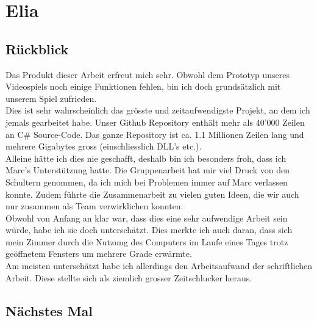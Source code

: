 \chapter{Elia}

\section{Rückblick}
Das Produkt dieser Arbeit erfreut mich sehr. Obwohl dem Prototyp unseres Videospiels noch einige Funktionen fehlen, bin ich doch grundsätzlich mit unserem Spiel zufrieden. \\
Dies ist sehr wahrscheinlich das grösste und zeitaufwendigste Projekt, an dem ich jemals gearbeitet habe. Unser Github Repository enthält mehr als 40'000 Zeilen an C\# Source-Code.
Das ganze Repository ist ca. 1.1 Millionen Zeilen lang und mehrere Gigabytes gross (einschliesslich DLL's etc.). \\
Alleine hätte ich dies nie geschafft, deshalb bin ich besonders froh, dass ich Marc's Unterstützung hatte. Die Gruppenarbeit hat mir viel Druck von den Schultern genommen, da ich mich bei Problemen immer auf Marc
verlassen konnte. Zudem führte die Zusammenarbeit zu vielen guten Ideen, die wir auch nur zusammen als Team verwirklichen konnten. 
\\
Obwohl von Anfang an klar war, dass dies eine sehr aufwendige Arbeit sein würde, habe ich sie doch unterschätzt. Dies merkte ich auch daran, dass sich mein Zimmer durch die Nutzung des Computers im Laufe eines Tages
trotz geöffnetem Fensters um mehrere Grade erwärmte.\\
Am meisten unterschätzt habe ich allerdings den Arbeitsaufwand der schriftlichen Arbeit. Diese stellte sich als ziemlich grosser Zeitschlucker heraus.

\section{Nächstes Mal}
